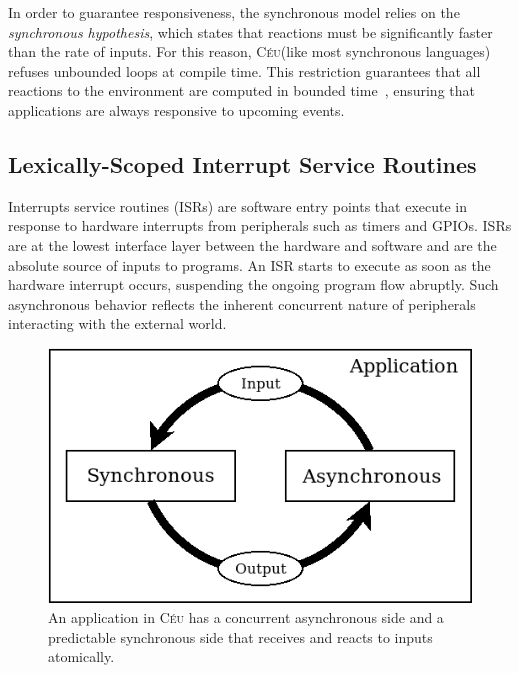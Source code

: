 \documentclass[sigplan,10pt,review,anonymous]{acmart}\settopmatter{printfolios=true,printccs=false,printacmref=false}
\newcommand{\CEU}{\textsc{C\'{e}u}\xspace}
\begin{document}
In order to guarantee responsiveness, the synchronous model relies on the
\emph{synchronous hypothesis}, which states that reactions must be
significantly faster than the rate of inputs.
%
For this reason, \CEU (like most synchronous languages) refuses unbounded loops
at compile time.
This restriction guarantees that all reactions to the environment are computed
in bounded time~\cite{ceu.lctes18}, ensuring that applications are always
responsive to upcoming events.

\subsection{Lexically-Scoped Interrupt Service Routines}
\label{sec.isrs}

Interrupts service routines (ISRs) are software entry points that execute in
response to hardware interrupts from peripherals such as timers and GPIOs.
ISRs are at the lowest interface layer between the hardware and software and
are the absolute source of inputs to programs.
%
An ISR starts to execute as soon as the hardware interrupt occurs, suspending
the ongoing program flow abruptly.
Such asynchronous behavior reflects the inherent concurrent nature of
peripherals interacting with the external world.

\begin{figure}
\centering
\includegraphics[width=\linewidth]{sync-async}
\caption{ An application in \CEU has a concurrent asynchronous side and a
          predictable synchronous side that receives and reacts to inputs
          atomically.
\label{fig.async}
}
\end{figure}
\end{document}
